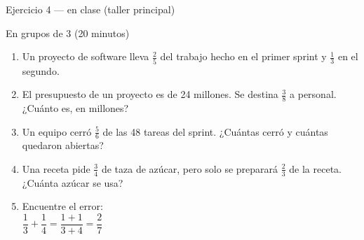 \documentclass[aspectratio=169,10pt]{beamer}
\begin{document}
\begin{frame}{Ejercicio 4 — en clase (taller principal)}
  \begin{alertblock}{En grupos de 3 (20 minutos)}
    \scriptsize
    \begin{enumerate}\setlength{\itemsep}{0.06cm}
      \item Un proyecto de software lleva $\tfrac{2}{5}$ del trabajo hecho en
            el primer sprint y $\tfrac{1}{3}$ en el segundo.
      \item El presupuesto de un proyecto es de 24 millones. Se destina
            $\tfrac{3}{8}$ a personal. ¿Cuánto es, en millones?
      \item Un equipo cerró $\tfrac{5}{6}$ de las 48 tareas del sprint.
            ¿Cuántas cerró y cuántas quedaron abiertas?
      \item Una receta pide $\tfrac{3}{4}$ de taza de azúcar, pero solo se
            preparará $\tfrac{2}{3}$ de la receta. ¿Cuánta azúcar se usa?
      \item Encuentre el error: \\
            \hspace*{0.3cm}
            $\dfrac{1}{3}+\dfrac{1}{4} = \dfrac{1+1}{3+4} = \dfrac{2}{7}$
    \end{enumerate}
  \end{alertblock}
\end{frame}
\end{document}
